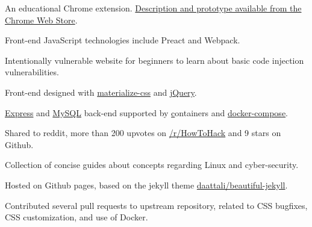

\begin{cventries}
  {
    \begin{cvitems}
      \item{An educational Chrome extension. \href{https://chrome.google.com/webstore/detail/mind-matter/ailffedpjgpjbdadlieaccchpcdiafjc}{Description and prototype available from the Chrome Web Store}.}
      \item{Front-end JavaScript technologies include Preact and Webpack.}
    \end{cvitems}
  }
  {
    \begin{cvitems}
      \item{Intentionally vulnerable website for beginners to learn about basic code injection vulnerabilities.}
      \item{Front-end designed with \href{http://materializecss.com/}{materialize-css} and \href{https://jquery.com/}{jQuery}.}
      \item{\href{https://expressjs.com/}{Express} and \href{https://www.mysql.com/}{MySQL} back-end supported by \href{Docker} containers and \href{https://docs.docker.com/compose/overview/}{docker-compose}.}
      \item{Shared to reddit, more than 200 upvotes on \href{https://www.reddit.com/r/HowToHack/comments/7zcfqd/i_made_an_easytohack_web_application_for/?ref=share&ref_source=link}{/r/HowToHack} and 9 stars on Github.}
    \end{cvitems}
  }
  {
    \begin{cvitems}
      \item{Collection of concise guides about concepts regarding Linux and cyber-security.}
      \item{Hosted on Github pages, based on the jekyll theme \href{https://github.com/daattali/beautiful-jekyll}{daattali/beautiful-jekyll}.}
      \item{Contributed several pull requests to upstream repository, related to CSS bugfixes, CSS customization, and use of Docker.}
    \end{cvitems}
  }

\end{cventries}